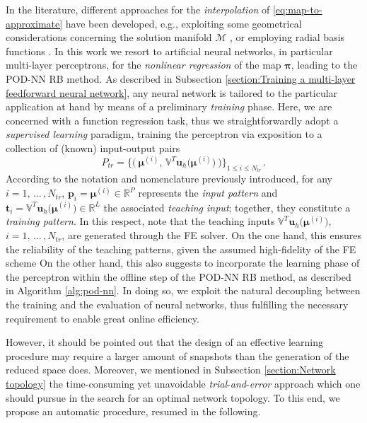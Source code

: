 \documentclass{elsarticle}
\numberwithin{equation}{section}
\theoremstyle{theorem}
\theoremstyle{definition}
\theoremstyle{remark}
\theoremstyle{proposition}
\numberwithin{figure}{section}
\newcommand{\bg}[1]{\boldsymbol{#1}}
\begin{document}
		In the literature, different approaches for the \emph{interpolation} of \eqref{eq:map-to-approximate} have been developed, e.g., exploiting some geometrical considerations concerning the solution manifold $\mathcal{M}$ \cite{Ams10}, or employing radial basis functions \cite{Chen17}. In this work we resort to artificial neural networks, in particular multi-layer perceptrons, for the \emph{nonlinear regression} of the map $\bg{\pi}$, leading to the POD-NN RB method. As described in Subsection \ref{section:Training a multi-layer feedforward neural network}, any neural network is tailored to the particular application at hand by means of a preliminary \emph{training} phase. Here, we are concerned with a function regression task, thus we straightforwardly adopt a \emph{supervised learning} paradigm, training the perceptron via exposition to a collection of (known) input-output pairs
		\begin{equation*}
			P_{tr} = \big\lbrace \big( ~ \bg{\mu}^{(i)}, \, \mathbb{V}^T \mathbf{u}_h \big( \bg{\mu}^{(i)} \big) ~ \big) \big\rbrace_{1 \leq i \leq N_{tr}} \, .
		\end{equation*} 
		According to the notation and nomenclature previously introduced, for any $i = 1, \, \ldots \, , N_{tr}$, $\mathbf{p}_i = \bg{\mu}^{(i)} \in \mathbb{R}^P$ represents the \emph{input pattern} and $\mathbf{t}_i =  \mathbb{V}^T \mathbf{u}_h \big( \bg{\mu}^{(i)} \big) \in \mathbb{R}^L$ the associated \emph{teaching input}; together, they constitute a \emph{training pattern}. In this respect, note that the teaching inputs $\mathbb{V}^T \mathbf{u}_h \big( \bg{\mu}^{(i)} \big)$, $i = 1, \, \ldots \, , N_{tr}$, are generated through the FE solver. On the one hand, this ensures the reliability of the teaching patterns, given the assumed high-fidelity of the FE scheme %
		On the other hand, this also suggests to incorporate the learning phase of the perceptron within the offline step of the POD-NN RB method, as described in Algorithm \ref{alg:pod-nn}. In doing so, we exploit the natural decoupling between the training and the evaluation of neural networks, thus fulfilling the necessary requirement to enable great online efficiency. %
				
		However, it should be pointed out that the design of an effective learning procedure may require a larger amount of snapshots than the generation of the reduced space does. Moreover, we mentioned in Subsection \ref{section:Network topology} the time-consuming yet unavoidable \emph{trial}-\emph{and}-\emph{error} approach which one should pursue in the search for an optimal network topology. To this end, we propose an automatic procedure, resumed in the following. %
		
\end{document}
